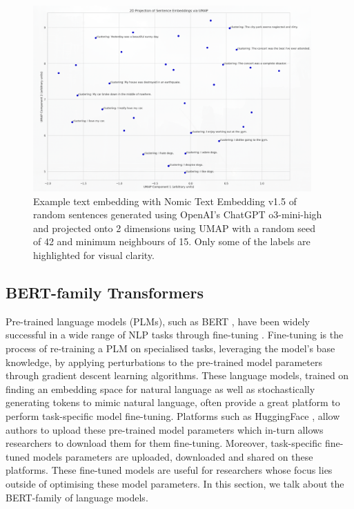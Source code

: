 \documentclass[10pt,oneside]{report}
\begin{document}
\begin{figure}[htbp]
    \centering
    \includegraphics[width=0.95\textwidth]{sentenceEmbeddingExample.png}
    \caption{Example text embedding with Nomic Text Embedding v1.5 \cite{nussbaum2024nomic} of random sentences generated using OpenAI's ChatGPT o3-mini-high and projected onto 2 dimensions using UMAP \cite{mcinnes2018umap} with a random seed of 42 and minimum neighbours of 15. Only some of the labels are highlighted for visual clarity.}\label{fig:sentenceEmbeddingExample}
\end{figure}

\subsection{BERT-family Transformers}\label{sec:BERT}
Pre-trained language models (PLMs), such as BERT \cite{devlin2019bert}, have been widely successful in a wide range of NLP tasks through fine-tuning \cite{edunov2019pre, min2023recent}. Fine-tuning is the process of re-training a PLM on specialised tasks, leveraging the model's base knowledge, by applying perturbations to the pre-trained model parameters through gradient descent learning algorithms. These language models, trained on finding an embedding space for natural language as well as stochastically generating tokens to mimic natural language, often provide a great platform to perform task-specific model fine-tuning. 
Platforms such as HuggingFace \cite{wolf2019huggingface}, allow authors to upload these pre-trained model parameters which in-turn allows researchers to download them for them fine-tuning. Moreover, task-specific fine-tuned models parameters are uploaded, downloaded and shared on these platforms. These fine-tuned models are useful for researchers whose focus lies outside of optimising these model parameters.
In this section, we talk about the BERT-family of language models.
\end{document}
